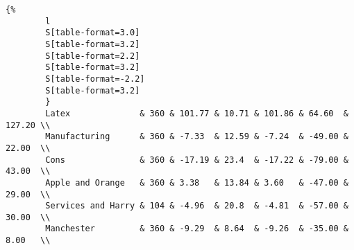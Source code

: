 \documentclass{article}
\begin{document}
\begin{verbatim}{%
		l
		S[table-format=3.0]
		S[table-format=3.2]
		S[table-format=2.2]
		S[table-format=3.2]
		S[table-format=-2.2]
		S[table-format=3.2]
		}
		Latex              & 360 & 101.77 & 10.71 & 101.86 & 64.60  & 127.20 \\
		Manufacturing      & 360 & -7.33  & 12.59 & -7.24  & -49.00 & 22.00  \\
		Cons               & 360 & -17.19 & 23.4  & -17.22 & -79.00 & 43.00  \\
		Apple and Orange   & 360 & 3.38   & 13.84 & 3.60   & -47.00 & 29.00  \\
		Services and Harry & 104 & -4.96  & 20.8  & -4.81  & -57.00 & 30.00  \\
		Manchester         & 360 & -9.29  & 8.64  & -9.26  & -35.00 & 8.00   \\
\end{verbatim}
\end{document}
